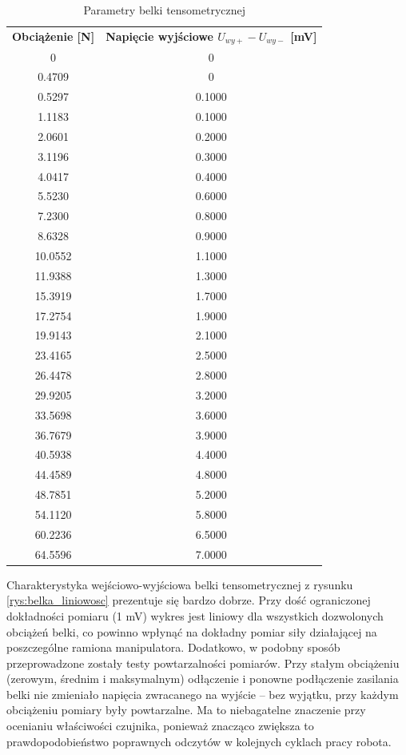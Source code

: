 \documentclass[printmode]{mgr}
\begin{document}
\begin{table}[tp]
  \caption{Parametry belki tensometrycznej}
  \label{tab:belka_liniowosc}
  \centering
  \begin{tabular}{||c|c||}
    \hline\hline
{\bf Obciążenie [N]} & {\bf Napięcie wyjściowe $U_{wy+}-U_{wy-}$ [mV]} \\
0 & 0 \\
0.4709 & 0 \\
0.5297 & 0.1000 \\
1.1183 & 0.1000\\
2.0601 & 0.2000\\
3.1196 & 0.3000\\
4.0417 & 0.4000\\
5.5230 & 0.6000\\
7.2300 & 0.8000\\
8.6328 & 0.9000\\
   10.0552 & 1.1000\\
   11.9388 & 1.3000\\
   15.3919 & 1.7000\\
   17.2754 & 1.9000\\
   19.9143 & 2.1000\\
   23.4165 & 2.5000\\
   26.4478 & 2.8000\\
   29.9205 & 3.2000\\
   33.5698 & 3.6000\\
   36.7679 & 3.9000\\
   40.5938 & 4.4000\\
   44.4589 & 4.8000\\
   48.7851 & 5.2000\\
   54.1120 & 5.8000\\
   60.2236 & 6.5000\\
   64.5596 & 7.0000\\
\hline\hline
  \end{tabular}
\end{table}

Charakterystyka wejściowo-wyjściowa belki tensometrycznej z rysunku \ref{rys:belka_liniowosc} prezentuje się bardzo dobrze. Przy 
dość ograniczonej dokładności pomiaru (1 mV) wykres jest liniowy dla wszystkich dozwolonych obciążeń belki, co powinno wpłynąć na
dokładny pomiar siły działającej na poszczególne ramiona manipulatora.
Dodatkowo, w podobny sposób przeprowadzone zostały testy powtarzalności pomiarów. Przy stałym obciążeniu (zerowym, średnim i maksymalnym) 
odłączenie i ponowne podłączenie zasilania belki nie zmieniało napięcia zwracanego na wyjście -- bez wyjątku, przy każdym obciążeniu
pomiary były powtarzalne. Ma to niebagatelne znaczenie przy ocenianiu właściwości czujnika, ponieważ znacząco zwiększa to
prawdopodobieństwo poprawnych odczytów w kolejnych cyklach pracy robota.
\end{document}
